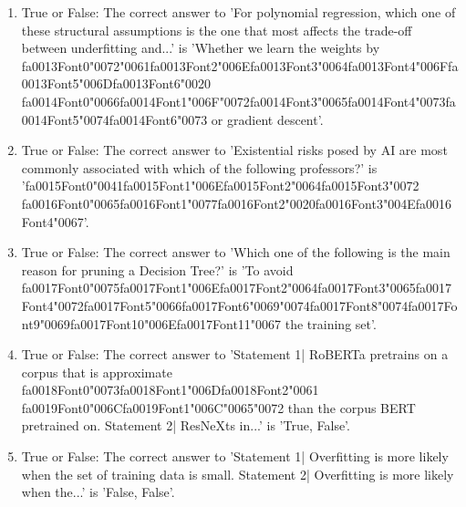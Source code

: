 \documentclass[12pt]{article}
\begin{document}
\begin{enumerate}[label=\arabic*.]
\item True or False: The correct answer to 'For polynomial regression, which one of these structural assumptions is the one that most affects the trade-off between underfitting and...' is 'Whether we learn the weights by {\csname fa0013Font0\endcsname\char"0072}{\char"0061}{\csname fa0013Font2\endcsname\char"006E}{\csname fa0013Font3\endcsname\char"0064}{\csname fa0013Font4\endcsname\char"006F}{\csname fa0013Font5\endcsname\char"006D}{\csname fa0013Font6\endcsname\char"0020} {\csname fa0014Font0\endcsname\char"0066}{\csname fa0014Font1\endcsname\char"006F}{\char"0072}{\csname fa0014Font3\endcsname\char"0065}{\csname fa0014Font4\endcsname\char"0073}{\csname fa0014Font5\endcsname\char"0074}{\csname fa0014Font6\endcsname\char"0073} or gradient descent'.
\item True or False: The correct answer to 'Existential risks posed by AI are most commonly associated with which of the following professors?' is '{\csname fa0015Font0\endcsname\char"0041}{\csname fa0015Font1\endcsname\char"006E}{\csname fa0015Font2\endcsname\char"0064}{\csname fa0015Font3\endcsname\char"0072} {\csname fa0016Font0\endcsname\char"0065}{\csname fa0016Font1\endcsname\char"0077}{\csname fa0016Font2\endcsname\char"0020}{\csname fa0016Font3\endcsname\char"004E}{\csname fa0016Font4\endcsname\char"0067}'.
\item True or False: The correct answer to 'Which one of the following is the main reason for pruning a Decision Tree?' is 'To avoid {\csname fa0017Font0\endcsname\char"0075}{\csname fa0017Font1\endcsname\char"006E}{\csname fa0017Font2\endcsname\char"0064}{\csname fa0017Font3\endcsname\char"0065}{\csname fa0017Font4\endcsname\char"0072}{\csname fa0017Font5\endcsname\char"0066}{\csname fa0017Font6\endcsname\char"0069}{\char"0074}{\csname fa0017Font8\endcsname\char"0074}{\csname fa0017Font9\endcsname\char"0069}{\csname fa0017Font10\endcsname\char"006E}{\csname fa0017Font11\endcsname\char"0067} the training set'.
\item True or False: The correct answer to 'Statement 1| RoBERTa pretrains on a corpus that is approximate {\csname fa0018Font0\endcsname\char"0073}{\csname fa0018Font1\endcsname\char"006D}{\csname fa0018Font2\endcsname\char"0061} {\csname fa0019Font0\endcsname\char"006C}{\csname fa0019Font1\endcsname\char"006C}{\char"0065}{\char"0072} than the corpus BERT pretrained on. Statement 2| ResNeXts in...' is 'True, False'.
\item True or False: The correct answer to 'Statement 1| Overfitting is more likely when the set of training data is small. Statement 2| Overfitting is more likely when the...' is 'False, False'.

\end{enumerate}
\end{document}
